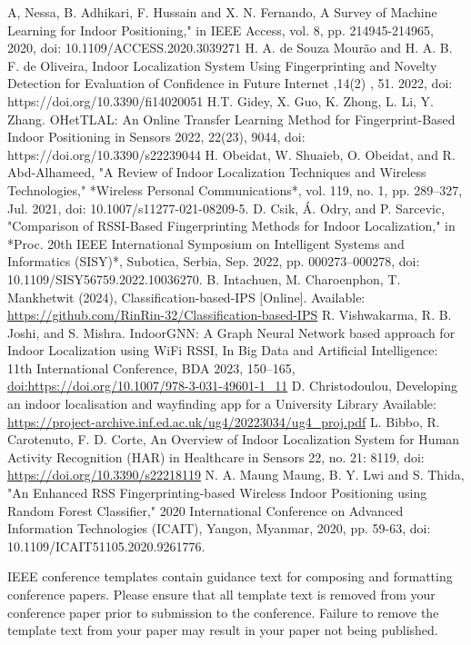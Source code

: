\documentclass[conference]{IEEEtran}
\begin{document}
	\begin{thebibliography}{00}
		 A, Nessa, B. Adhikari, F. Hussain and X. N. Fernando, A Survey of Machine Learning for Indoor Positioning," in IEEE Access, vol. 8, pp. 214945-214965, 2020, doi: 10.1109/ACCESS.2020.3039271
		 H. A. de Souza Mourão and H. A. B. F. de Oliveira, Indoor Localization System Using Fingerprinting and Novelty Detection for Evaluation of Confidence in Future Internet ,14(2) , 51. 2022, doi:  https://doi.org/10.3390/fi14020051 
		 H.T. Gidey, X. Guo, K. Zhong, L. Li, Y. Zhang. OHetTLAL: An Online Transfer Learning Method for Fingerprint-Based Indoor Positioning in  Sensors 2022, 22(23), 9044, doi: https://doi.org/10.3390/s22239044
		 H. Obeidat, W. Shuaieb, O. Obeidat, and R. Abd-Alhameed, "A Review of Indoor Localization Techniques and Wireless Technologies," *Wireless Personal Communications*, vol. 119, no. 1, pp. 289–327, Jul. 2021, doi: 10.1007/s11277-021-08209-5.
		 D. Csik, Á. Odry, and P. Sarcevic, "Comparison of RSSI-Based Fingerprinting Methods for Indoor Localization," in *Proc. 20th IEEE International Symposium on Intelligent Systems and Informatics (SISY)*, Subotica, Serbia, Sep. 2022, pp. 000273–000278, doi: 10.1109/SISY56759.2022.10036270.
		 B. Intachuen, M. Charoenphon, T. Mankhetwit (2024), Classification-based-IPS [Online]. Available: \url{https://github.com/RinRin-32/Classification-based-IPS}
		 R. Vishwakarma, R. B. Joshi, and S. Mishra. IndoorGNN: A Graph Neural Network based approach for Indoor Localization using WiFi RSSI, In Big Data and Artificial Intelligence: 11th International Conference, BDA 2023, 150–165, \url{doi:https://doi.org/10.1007/978-3-031-49601-1_11}
		 D. Christodoulou,  Developing an indoor localisation and wayfinding app for a University Library Available: \url{https://project-archive.inf.ed.ac.uk/ug4/20223034/ug4_proj.pdf}
		 L. Bibbo, R. Carotenuto, F. D. Corte, An Overview of Indoor Localization System for Human Activity Recognition (HAR) in Healthcare in Sensors 22, no. 21: 8119, doi: \url{https://doi.org/10.3390/s22218119}
		N. A. Maung Maung, B. Y. Lwi and S. Thida, "An Enhanced RSS Fingerprinting-based Wireless Indoor Positioning using Random Forest Classifier," 2020 International Conference on Advanced Information Technologies (ICAIT), Yangon, Myanmar, 2020, pp. 59-63, doi: 10.1109/ICAIT51105.2020.9261776.
		
	\end{thebibliography}
	\vspace{12pt}
	\color{red}
	IEEE conference templates contain guidance text for composing and formatting conference papers. Please ensure that all template text is removed from your conference paper prior to submission to the conference. Failure to remove the template text from your paper may result in your paper not being published.
	
\end{document}
